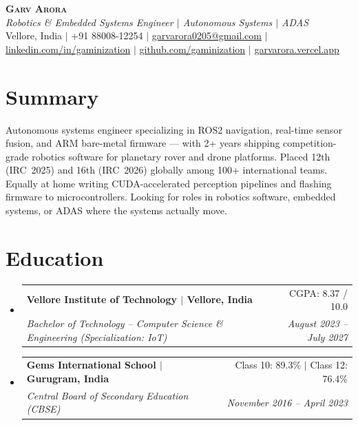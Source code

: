 \documentclass[letterpaper,10pt]{article}
\makeatletter
\newcommand{\resumeSubheading}[4]{
  \item
    \begin{tabular*}{0.97\textwidth}[t]{l@{\extracolsep{\fill}}r}
      \textbf{#1} & #2 \\
      \textit{\small#3} & \textit{\small #4} \\
    \end{tabular*}\vspace{-4pt}
}
\newcommand{\resumeSubHeadingListStart}{
  \begin{itemize}[leftmargin=0.15in, label={}, itemsep=3pt, parsep=0pt, topsep=2pt]
}
\newcommand{\resumeSubHeadingListEnd}{\end{itemize}}
\makeatother
\begin{document}
\begin{center}
    \textbf{\Huge \scshape Garv Arora} \\ \vspace{2pt}
    \small\textit{Robotics \& Embedded Systems Engineer $|$ Autonomous Systems $|$ ADAS} \\ \vspace{2pt}
    \small Vellore, India $|$
    +91 88008-12254 $|$
    \href{mailto:garvarora0205@gmail.com}{garvarora0205@gmail.com} $|$
    \href{https://linkedin.com/in/gaminization}{linkedin.com/in/gaminization} $|$
    \href{https://github.com/gaminization}{github.com/gaminization} $|$
    \href{https://garvarora.vercel.app}{garvarora.vercel.app}
\end{center}

\section{Summary}
\vspace{1pt}
\small{Autonomous systems engineer specializing in ROS2 navigation, real-time sensor fusion, and ARM bare-metal firmware --- with 2+ years shipping competition-grade robotics software for planetary rover and drone platforms. Placed 12th (IRC~2025) and 16th (IRC~2026) globally among 100+ international teams. Equally at home writing CUDA-accelerated perception pipelines and flashing firmware to microcontrollers. Looking for roles in robotics software, embedded systems, or ADAS where the systems actually move.}

\section{Education}
  \resumeSubHeadingListStart
    \resumeSubheading
      {Vellore Institute of Technology $|$ Vellore, India}{CGPA: 8.37 / 10.0}
      {Bachelor of Technology -- Computer Science \& Engineering (Specialization: IoT)}{August 2023 -- July 2027}
    \resumeSubheading
      {Gems International School $|$ Gurugram, India}{Class 10: 89.3\% $|$ Class 12: 76.4\%}
      {Central Board of Secondary Education (CBSE)}{November 2016 -- April 2023}
  \resumeSubHeadingListEnd

\end{document}

